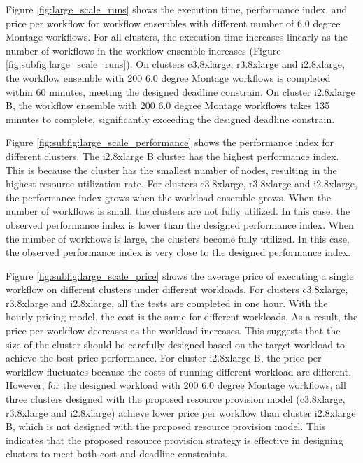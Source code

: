 Figure \ref{fig:large_scale_runs} shows the execution time, performance index, and price per workflow for workflow ensembles with different number of 6.0 degree Montage workflows. For all clusters, the execution time increases linearly as the number of workflows in the workflow ensemble increases (Figure \ref{fig:subfig:large_scale_runs}). On clusters c3.8xlarge, r3.8xlarge and i2.8xlarge, the workflow ensemble with 200 6.0 degree Montage workflows is completed within 60 minutes, meeting the designed deadline constrain. On cluster i2.8xlarge B, the workflow ensemble with 200 6.0 degree Montage workflows takes 135 minutes to complete, significantly exceeding the designed deadline constrain.

Figure \ref{fig:subfig:large_scale_performance} shows the performance index for different clusters. The i2.8xlarge B cluster has the highest performance index. This is because the cluster has the smallest number of nodes, resulting in the highest resource utilization rate. For clusters c3.8xlarge, r3.8xlarge and i2.8xlarge, the performance index grows when the workload ensemble grows. When the number of workflows is small, the clusters are not fully utilized. In this case, the observed performance index is lower than the designed performance index. When the number of workflows is large, the clusters become fully utilized. In this case, the observed performance index is very close to the designed performance index. 


Figure \ref{fig:subfig:large_scale_price} shows the average price of executing a single workflow on different clusters under different workloads. For clusters c3.8xlarge, r3.8xlarge and i2.8xlarge, all the tests are completed in one hour. With the hourly pricing model, the cost is the same for different workloads. As a result, the price per workflow decreases as the workload increases. This suggests that the size of the cluster should be carefully designed based on the target workload to achieve the best price performance. For cluster i2.8xlarge B, the price per workflow fluctuates because the costs of running different workload are different. However, for the designed workload with 200 6.0 degree Montage workflows, all three clusters designed with the proposed resource provision model (c3.8xlarge, r3.8xlarge and i2.8xlarge) achieve lower price per workflow than cluster i2.8xlarge B, which is not designed with the proposed resource provision model. This indicates that the proposed resource provision strategy is effective in designing clusters to meet both cost and deadline constraints. 

